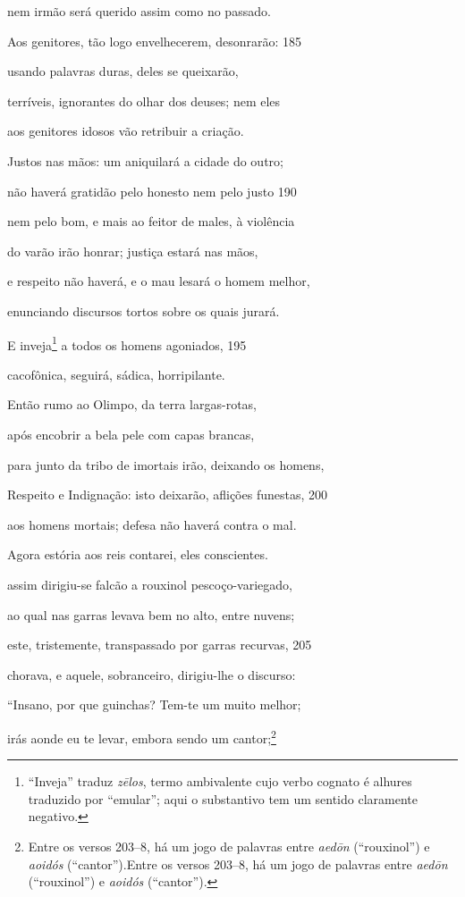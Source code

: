 nem irmão será querido assim como no passado.

Aos genitores, tão logo envelhecerem, desonrarão: \num{185}

usando palavras duras, deles se queixarão,

terríveis, ignorantes do olhar dos deuses; nem eles

aos genitores idosos vão retribuir a criação.

Justos nas mãos: um aniquilará a cidade do outro;

não haverá gratidão pelo honesto nem pelo justo \num{190}

nem pelo bom, e mais ao feitor de males, à violência

do varão irão honrar; justiça estará nas mãos,

e respeito não haverá, e o mau lesará o homem melhor,

enunciando discursos tortos sobre os quais jurará.

E inveja\footnote{``Inveja'' traduz \emph{zēlos}, termo ambivalente cujo verbo
cognato é alhures traduzido por ``emular''; aqui o substantivo tem um
sentido claramente negativo.} a todos os homens agoniados, \num{195}

cacofônica, seguirá, sádica, horripilante.

Então rumo ao Olimpo, da terra largas-rotas,

após encobrir a bela pele com capas brancas,

para junto da tribo de imortais irão, deixando os homens,

Respeito e Indignação: isto deixarão, aflições funestas, \num{200}

aos homens mortais; defesa não haverá contra o mal.

Agora estória aos reis contarei, eles conscientes.

assim dirigiu-se falcão a rouxinol pescoço-variegado,

ao qual nas garras levava bem no alto, entre nuvens;

este, tristemente, transpassado por garras recurvas, \num{205}

chorava, e aquele, sobranceiro, dirigiu-lhe o discurso:

``Insano, por que guinchas? Tem-te um muito melhor;

irás aonde eu te levar, embora sendo um cantor;\footnote{Entre os versos 203--8, há um jogo de palavras entre \emph{aedōn} (``rouxinol'') e \emph{aoidós} (``cantor'').Entre os versos 203--8, há um jogo de palavras entre \emph{aedōn} (``rouxinol'') e \emph{aoidós} (``cantor'').}


